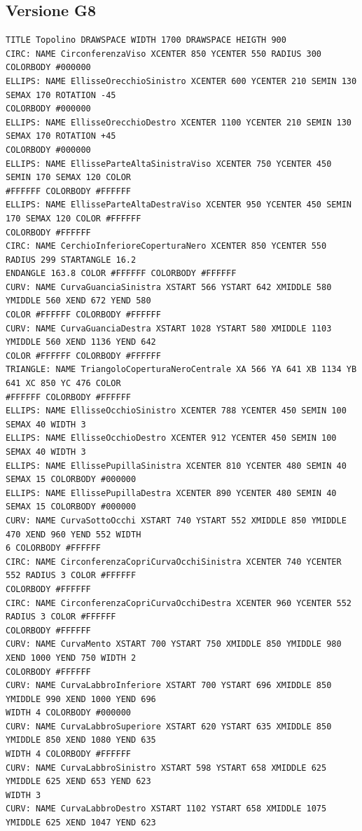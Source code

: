 \documentclass[a4paper]{article}
\begin{document}
\subsection{Versione G8}
\begin{verbatim}
TITLE Topolino DRAWSPACE WIDTH 1700 DRAWSPACE HEIGTH 900
CIRC: NAME CirconferenzaViso XCENTER 850 YCENTER 550 RADIUS 300 COLORBODY #000000
ELLIPS: NAME EllisseOrecchioSinistro XCENTER 600 YCENTER 210 SEMIN 130 SEMAX 170 ROTATION -45
COLORBODY #000000
ELLIPS: NAME EllisseOrecchioDestro XCENTER 1100 YCENTER 210 SEMIN 130 SEMAX 170 ROTATION +45
COLORBODY #000000
ELLIPS: NAME EllisseParteAltaSinistraViso XCENTER 750 YCENTER 450 SEMIN 170 SEMAX 120 COLOR
#FFFFFF COLORBODY #FFFFFF
ELLIPS: NAME EllisseParteAltaDestraViso XCENTER 950 YCENTER 450 SEMIN 170 SEMAX 120 COLOR #FFFFFF
COLORBODY #FFFFFF
CIRC: NAME CerchioInferioreCoperturaNero XCENTER 850 YCENTER 550 RADIUS 299 STARTANGLE 16.2
ENDANGLE 163.8 COLOR #FFFFFF COLORBODY #FFFFFF
CURV: NAME CurvaGuanciaSinistra XSTART 566 YSTART 642 XMIDDLE 580 YMIDDLE 560 XEND 672 YEND 580
COLOR #FFFFFF COLORBODY #FFFFFF
CURV: NAME CurvaGuanciaDestra XSTART 1028 YSTART 580 XMIDDLE 1103 YMIDDLE 560 XEND 1136 YEND 642
COLOR #FFFFFF COLORBODY #FFFFFF
TRIANGLE: NAME TriangoloCoperturaNeroCentrale XA 566 YA 641 XB 1134 YB 641 XC 850 YC 476 COLOR
#FFFFFF COLORBODY #FFFFFF
ELLIPS: NAME EllisseOcchioSinistro XCENTER 788 YCENTER 450 SEMIN 100 SEMAX 40 WIDTH 3
ELLIPS: NAME EllisseOcchioDestro XCENTER 912 YCENTER 450 SEMIN 100 SEMAX 40 WIDTH 3
ELLIPS: NAME EllissePupillaSinistra XCENTER 810 YCENTER 480 SEMIN 40 SEMAX 15 COLORBODY #000000
ELLIPS: NAME EllissePupillaDestra XCENTER 890 YCENTER 480 SEMIN 40 SEMAX 15 COLORBODY #000000
CURV: NAME CurvaSottoOcchi XSTART 740 YSTART 552 XMIDDLE 850 YMIDDLE 470 XEND 960 YEND 552 WIDTH
6 COLORBODY #FFFFFF
CIRC: NAME CirconferenzaCopriCurvaOcchiSinistra XCENTER 740 YCENTER 552 RADIUS 3 COLOR #FFFFFF
COLORBODY #FFFFFF
CIRC: NAME CirconferenzaCopriCurvaOcchiDestra XCENTER 960 YCENTER 552 RADIUS 3 COLOR #FFFFFF
COLORBODY #FFFFFF
CURV: NAME CurvaMento XSTART 700 YSTART 750 XMIDDLE 850 YMIDDLE 980 XEND 1000 YEND 750 WIDTH 2
COLORBODY #FFFFFF
CURV: NAME CurvaLabbroInferiore XSTART 700 YSTART 696 XMIDDLE 850 YMIDDLE 990 XEND 1000 YEND 696
WIDTH 4 COLORBODY #000000
CURV: NAME CurvaLabbroSuperiore XSTART 620 YSTART 635 XMIDDLE 850 YMIDDLE 850 XEND 1080 YEND 635
WIDTH 4 COLORBODY #FFFFFF
CURV: NAME CurvaLabbroSinistro XSTART 598 YSTART 658 XMIDDLE 625 YMIDDLE 625 XEND 653 YEND 623
WIDTH 3
CURV: NAME CurvaLabbroDestro XSTART 1102 YSTART 658 XMIDDLE 1075 YMIDDLE 625 XEND 1047 YEND 623

\end{verbatim}
\end{document}
